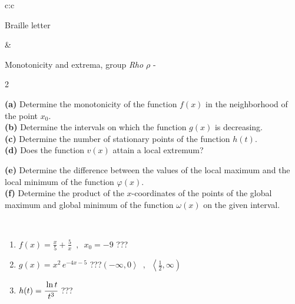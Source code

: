 \documentclass[10pt]{report}
\begin{document}
\begin{tabular}{c:c}
\begin{minipage}[c][104.5mm][t]{0.5\linewidth}
\begin{center}
\begin{minipage}{0.20\linewidth}
\begin{center}
{\small Braille letter}
\end{center}
\end{minipage}
\end{center}
\end{minipage}
&
\begin{minipage}[c][104.5mm][t]{0.5\linewidth}
\begin{center}
\vspace{5mm}
{\huge Monotonicity and extrema, group \textit{Rho $\rho$} -}\\[5mm]
\begin{minipage}{0.95\linewidth}
\begin{center}
{\small \begin{multicols}{2} \raggedright
\textbf{(a)} Determine the monotonicity of the function \(f(x)\) in the neighborhood of the point \(x_0\). \\[1mm]
\textbf{(b)} Determine the intervals on which the function \(g(x)\) is decreasing. \\[1mm]
\textbf{(c)} Determine the number of stationary points of the function \(h(t)\). \\[1mm]
\textbf{(d)} Does the function \(v(x)\) attain a local extremum? \par \columnbreak
\textbf{(e)} Determine the difference between the values of the local maximum and the local minimum of the function \(\varphi(x)\). \\[1mm]
\textbf{(f)} Determine the product of the \(x\)-coordinates of the points of the global maximum and global minimum of the function \(\omega(x)\) on the given interval. \\[1mm]
\end{multicols}
}
\end{center}
\end{minipage}
\\[1mm]
\begin{minipage}{0.79\linewidth}
\begin{center}
\begin{varwidth}{\linewidth}
\setlength{\itemsep}{0pt}
\begin{enumerate}
\normalsize
\item $f(x)=\frac{x}{5}+\frac{5}{x} \enspace , \enspace x_0=-9$\quad \dotfill\; ???\;\dotfill \quad {}
\item $g(x)=x^2\, e^{-4x-5}$\quad \dotfill\; ???\;\dotfill \quad $\left(-\infty , 0\right\rangle\enspace , \enspace \left\langle\frac{1}{2} , \infty\right)$
\item $h(t)=\cfrac{\ln t}{t^3}$\quad \dotfill\; ???\;\dotfill {}

\end{enumerate}
\end{varwidth}
\end{center}
\end{minipage}
\end{center}
\end{minipage}
\end{tabular}
\end{document}
